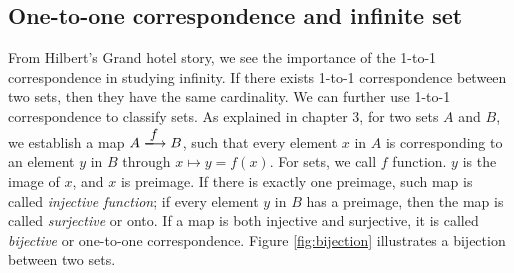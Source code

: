 \documentclass{article}
\begin{document}
\begin{Exercise}
\end{Exercise}

\subsection{One-to-one correspondence and infinite set}

From Hilbert's Grand hotel story, we see the importance of the 1-to-1 correspondence in studying infinity. If there exists 1-to-1 correspondence between two sets, then they have the same cardinality. We can further use 1-to-1 correspondence to classify sets. As explained in chapter 3, for two sets $A$ and $B$, we establish a map $A \arrowto{f} B$, such that every element $x$ in $A$ is corresponding to an element $y$ in $B$ through $x \mapsto y = f(x)$. For sets, we call $f$ function. $y$ is the image of $x$, and $x$ is preimage. If there is exactly one preimage, such map is called {\em injective function}; if every element $y$ in $B$ has a preimage, then the map is called {\em surjective} or onto. If a map is both injective and surjective, it is called {\em bijective} or one-to-one correspondence. Figure \ref{fig:bijection} illustrates a bijection between two sets.
\end{document}
